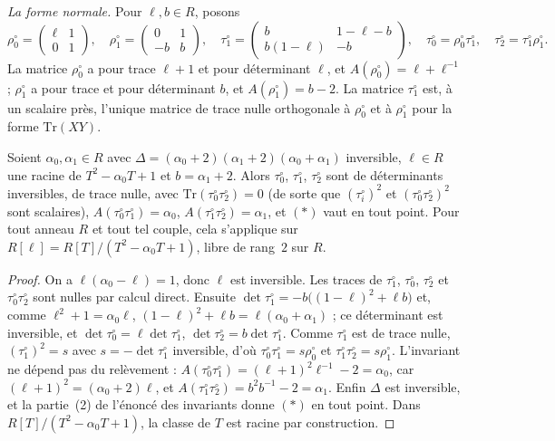 \noindent\emph{La forme normale.} Pour $\ell, b \in R$, posons
\[
\rho_0^\circ = \begin{pmatrix} \ell & 1 \\ 0 & 1 \end{pmatrix}, \quad
\rho_1^\circ = \begin{pmatrix} 0 & 1 \\ -b & b \end{pmatrix}, \quad
\tau_1^\circ = \begin{pmatrix} b & 1 - \ell - b \\ b(1 - \ell) & -b \end{pmatrix}, \quad
\tau_0^\circ = \rho_0^\circ\tau_1^\circ, \quad \tau_2^\circ = \tau_1^\circ\rho_1^\circ .
\]
La matrice $\rho_0^\circ$ a pour trace $\ell + 1$ et pour déterminant $\ell$, et $A(\rho_0^\circ) = \ell + \ell^{-1}$ ; $\rho_1^\circ$ a pour trace et pour déterminant $b$, et $A(\rho_1^\circ) = b - 2$. La matrice $\tau_1^\circ$ est, à un scalaire près, l'unique matrice de trace nulle orthogonale à $\rho_0^\circ$ et à $\rho_1^\circ$ pour la forme $\mathrm{Tr}(XY)$.

\begin{enonce}
Soient $\alpha_0, \alpha_1 \in R$ avec $\Delta = (\alpha_0 + 2)(\alpha_1 + 2)(\alpha_0 + \alpha_1)$ inversible, $\ell \in R$ une racine de $T^2 - \alpha_0 T + 1$ et $b = \alpha_1 + 2$. Alors $\tau_0^\circ$, $\tau_1^\circ$, $\tau_2^\circ$ sont de déterminants inversibles, de trace nulle, avec $\mathrm{Tr}(\tau_0^\circ\tau_2^\circ) = 0$ (de sorte que $(\tau_i^\circ)^2$ et $(\tau_0^\circ\tau_2^\circ)^2$ sont scalaires), $A(\tau_0^\circ\tau_1^\circ) = \alpha_0$, $A(\tau_1^\circ\tau_2^\circ) = \alpha_1$, et $(*)$ vaut en tout point. Pour tout anneau $R$ et tout tel couple, cela s'applique sur $R[\ell] = R[T]/(T^2 - \alpha_0 T + 1)$, libre de rang~$2$ sur $R$.
\end{enonce}

\begin{proof}
On a $\ell(\alpha_0 - \ell) = 1$, donc $\ell$ est inversible. Les traces de $\tau_1^\circ$, $\tau_0^\circ$, $\tau_2^\circ$ et $\tau_0^\circ\tau_2^\circ$ sont nulles par calcul direct. Ensuite $\det\tau_1^\circ = -b\big((1-\ell)^2 + \ell b\big)$ et, comme $\ell^2 + 1 = \alpha_0\ell$, $(1 - \ell)^2 + \ell b = \ell(\alpha_0 + \alpha_1)$ ; ce déterminant est inversible, et $\det\tau_0^\circ = \ell\det\tau_1^\circ$, $\det\tau_2^\circ = b\det\tau_1^\circ$. Comme $\tau_1^\circ$ est de trace nulle, $(\tau_1^\circ)^2 = s$ avec $s = -\det\tau_1^\circ$ inversible, d'où $\tau_0^\circ\tau_1^\circ = s\rho_0^\circ$ et $\tau_1^\circ\tau_2^\circ = s\rho_1^\circ$. L'invariant ne dépend pas du relèvement : $A(\tau_0^\circ\tau_1^\circ) = (\ell + 1)^2\ell^{-1} - 2 = \alpha_0$, car $(\ell + 1)^2 = (\alpha_0 + 2)\ell$, et $A(\tau_1^\circ\tau_2^\circ) = b^2 b^{-1} - 2 = \alpha_1$. Enfin $\Delta$ est inversible, et la partie~(2) de l'énoncé des invariants donne $(*)$ en tout point. Dans $R[T]/(T^2 - \alpha_0 T + 1)$, la classe de $T$ est racine par construction.
\end{proof}

